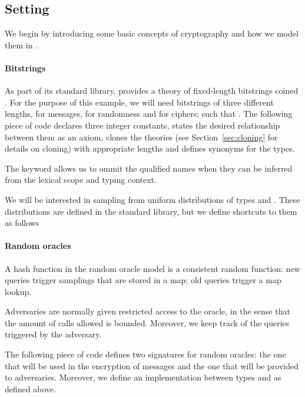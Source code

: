 \subsection{Setting}
We begin by introducing some basic concepts of cryptography and how we
model them in \EasyCrypt.

\paragraph{Bitstrings}
As part of its standard library, \EasyCrypt provides a theory of fixed-length
bitstrings coined . For the purpose of this example, we will
need bitstrings of three different lengths,  for messages,
 for randomness and  for ciphers; such that . The following piece of code declares three integer constants,
states the desired relationship between them as an axiom, clones the
theories (see Section~\ref{sec:cloning} for details on cloning) with
appropriate lengths and defines synonyms for the types.


The  keyword allows us to ommit the qualified names when
they can be inferred from the lexical scope and typing context. 

We will be interested in sampling from uniform distributions of types
 and . These distributions are defined in
the standard library, but we define shortcuts to them as follows



\paragraph{Random oracles}
A hash function in the random oracle model is a consistent random
function: new queries trigger samplings that are stored in a map; old
queries trigger a map lookup. 

Adversaries are normally given restricted access to the oracle, in the
sense that the amount of calls allowed is bounded. Moreover, we keep
track of the queries triggered by the adversary. 

The following piece of code defines two signatures for random oracles:
the one that will be used in the encryption of messages and the one
that will be provided to adversaries. Moreover, we define an
implementation between types  and  as
defined above.

